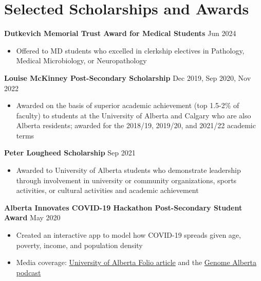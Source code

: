 \documentclass{article}
\begin{document}


\section*{\textcolor{my_colour}{Selected Scholarships and Awards} }
\vspace{-.25em} \hrulefill \vspace{.25em}

\textbf{Dutkevich Memorial Trust Award for Medical Students} \hfill Jun 2024
\begin{itemize}
    \item Offered to MD students who excelled in clerkship electives in Pathology, Medical Microbiology, or Neuropathology
\end{itemize} \vspace{1em}

\textbf{Louise McKinney Post-Secondary Scholarship} \hfill Dec 2019, Sep 2020, Nov 2022
\begin{itemize}
    \item Awarded on the basis of superior academic achievement (top 1.5-2\% of faculty) to students at the University of Alberta and Calgary who are also Alberta residents; awarded for the 2018/19, 2019/20, and 2021/22 academic terms
\end{itemize} \vspace{1em}

\textbf{Peter Lougheed Scholarship} \hfill Sep 2021
\begin{itemize}
    \item Awarded to University of Alberta students who demonstrate leadership through involvement in university or community organizations, sports activities, or cultural activities and academic achievement
\end{itemize} \vspace{1em}

\textbf{Alberta Innovates COVID-19 Hackathon Post-Secondary Student Award} \hfill May 2020
\begin{itemize}
    \item Created an interactive app to model how COVID-19 spreads given age, poverty, income, and population density
    \item Media coverage: \href{https://www.folio.ca/students-develop-online-tool-to-predict-covid-19-spread-based-on-demographics/}{University of Alberta Folio article} and the \href{https://genomealberta.ca/genomics/genomics_blog_08182001.aspx}{Genome Alberta podcast}
\end{itemize} \vspace{1em}
\end{document}
